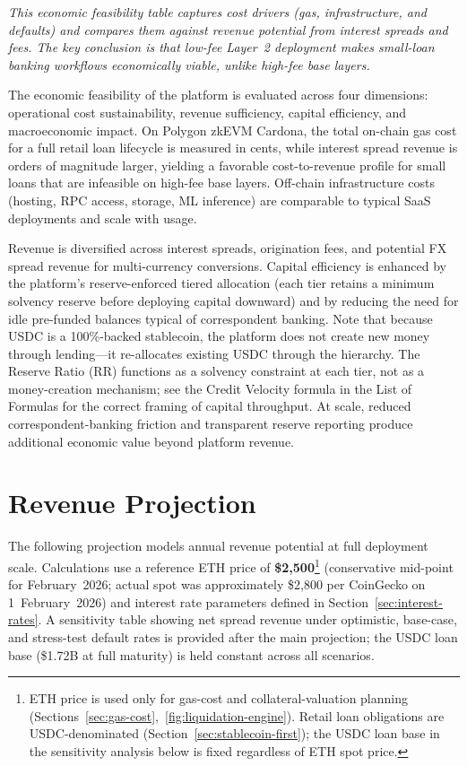 \documentclass[12pt,a4paper]{report}
\begin{document}
\vspace{2pt}
\noindent\textit{\small This economic feasibility table captures cost drivers (gas, infrastructure, and defaults) and compares them against revenue potential from interest spreads and fees. The key conclusion is that low-fee Layer~2 deployment makes small-loan banking workflows economically viable, unlike high-fee base layers.}

The economic feasibility of the platform is evaluated across four dimensions: operational cost sustainability, revenue sufficiency, capital efficiency, and macroeconomic impact. On Polygon zkEVM Cardona, the total on-chain gas cost for a full retail loan lifecycle is measured in cents, while interest spread revenue is orders of magnitude larger, yielding a favorable cost-to-revenue profile for small loans that are infeasible on high-fee base layers. Off-chain infrastructure costs (hosting, RPC access, storage, ML inference) are comparable to typical SaaS deployments and scale with usage.

Revenue is diversified across interest spreads, origination fees, and potential FX spread revenue for multi-currency conversions. Capital efficiency is enhanced by the platform's reserve-enforced tiered allocation (each tier retains a minimum solvency reserve before deploying capital downward) and by reducing the need for idle pre-funded balances typical of correspondent banking. Note that because USDC is a 100\%-backed stablecoin, the platform does not create new money through lending---it re-allocates existing USDC through the hierarchy. The Reserve Ratio (RR) functions as a solvency constraint at each tier, not as a money-creation mechanism; see the Credit Velocity formula in the List of Formulas for the correct framing of capital throughput. At scale, reduced correspondent-banking friction and transparent reserve reporting produce additional economic value beyond platform revenue.

\section{Revenue Projection}

The following projection models annual revenue potential at full deployment scale. Calculations use a reference ETH price of \textbf{\$2,500}\footnote{ETH price is used only for gas-cost and collateral-valuation planning (Sections~\ref{sec:gas-cost},~\ref{fig:liquidation-engine}). Retail loan obligations are USDC-denominated (Section~\ref{sec:stablecoin-first}); the USDC loan base in the sensitivity analysis below is fixed regardless of ETH spot price.} (conservative mid-point for February~2026; actual spot was approximately \$2,800 per CoinGecko on 1~February~2026) and interest rate parameters defined in Section~\ref{sec:interest-rates}. A sensitivity table showing net spread revenue under optimistic, base-case, and stress-test default rates is provided after the main projection; the USDC loan base (\$1.72B at full maturity) is held constant across all scenarios.
\end{document}
